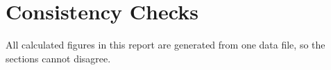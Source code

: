 \clearpage
\section*{Consistency Checks}
All calculated figures in this report are generated from one data file, so the sections cannot disagree.


